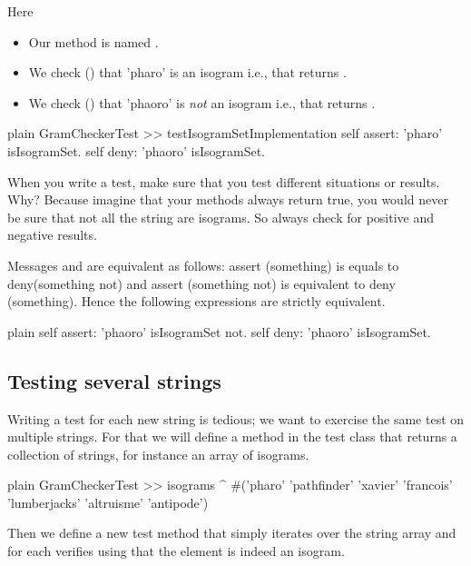 \documentclass[10pt,twoside,english]{_support/latex/sbabook/sbabook}
\begin{document}
Here 

\begin{itemize}
\item Our method is named .
\item We check () that 'pharo' is an isogram i.e., that  returns . 
\item We check () that 'phaoro' is \textit{not} an isogram i.e., that  returns .
\end{itemize}

\begin{displaycode}{plain}
GramCheckerTest >> testIsogramSetImplementation
	self assert: 'pharo' isIsogramSet.
	self deny: 'phaoro' isIsogramSet.
\end{displaycode}

\begin{important}
When you write a test, make sure that you test different situations or results. Why? Because imagine that your methods always return true, you would never be sure that not all the string are isograms. So always check for positive and negative results. 
\end{important}

Messages  and  are equivalent as follows: assert (something) is equals to deny(something not) and assert (something not) is equivalent to deny (something). Hence the following expressions are strictly equivalent. 
	

\begin{displaycode}{plain}
	self assert: 'phaoro' isIsogramSet not.
	self deny: 'phaoro' isIsogramSet.
\end{displaycode}
\subsection{Testing several strings}
Writing a test for each new string is tedious; we want to exercise the same test on multiple strings.
For that we will define a method in the test class that returns a collection of strings, for instance an array of isograms.

\begin{displaycode}{plain}
GramCheckerTest >> isograms
	^ #('pharo' 'pathfinder' 'xavier' 'francois' 'lumberjacks' 'altruisme' 'antipode')
\end{displaycode}

Then we define a new test method  that simply iterates over the string array and for each verifies using  that the element is indeed an isogram.
\end{document}
